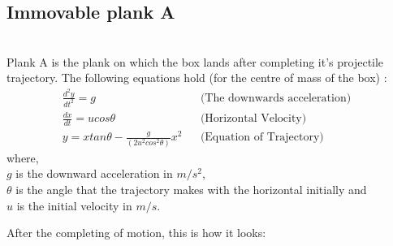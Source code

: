 \documentclass[11pt]{article}
\begin{document}
\pagebreak

\subsection{Immovable plank A}
\setlength\fboxsep{2pt}
\setlength\fboxrule{1pt}
\\

Plank A is the plank on which the box lands after completing it's projectile trajectory. The following equations hold (for the centre of mass of the box) \cite{hcv}:
\begin{align}
\frac{d^2 y}{dt^2} = g &&\mbox{(The downwards acceleration)}&
\\
\frac{dx}{dt} = ucos\theta &&\mbox{(Horizontal Velocity)}&
\\
y = xtan\theta - \frac{g}{(2u^2 cos^2 \theta)}x^2 &&\mbox{(Equation of Trajectory)}&
\end{align}
where,\\
$g$ is the downward acceleration in $m/s^2$,\\
$\theta$ is the angle that the trajectory makes with the horizontal initially and\\
$u$ is the initial velocity in $m/s$.

After the completing of motion, this is how it looks: \\
\\
\setlength\fboxsep{2pt}
\setlength\fboxrule{1pt}
\\
\end{document}
